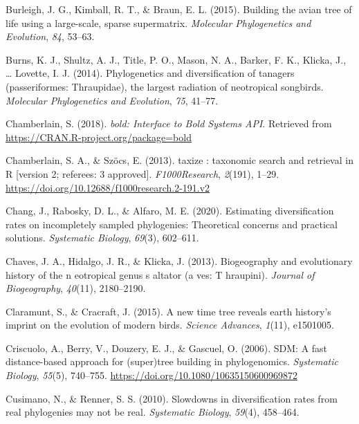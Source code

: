\documentclass[english,man]{apa6}
\begin{document}
\leavevmode\hypertarget{ref-burleigh2015building}{}%
Burleigh, J. G., Kimball, R. T., \& Braun, E. L. (2015). Building the avian tree of life using a large-scale, sparse supermatrix. \emph{Molecular Phylogenetics and Evolution}, \emph{84}, 53--63.

\leavevmode\hypertarget{ref-burns2014phylogenetics}{}%
Burns, K. J., Shultz, A. J., Title, P. O., Mason, N. A., Barker, F. K., Klicka, J., \ldots{} Lovette, I. J. (2014). Phylogenetics and diversification of tanagers (passeriformes: Thraupidae), the largest radiation of neotropical songbirds. \emph{Molecular Phylogenetics and Evolution}, \emph{75}, 41--77.

\leavevmode\hypertarget{ref-Chamberlain2018}{}%
Chamberlain, S. (2018). \emph{bold: Interface to Bold Systems API}. Retrieved from \url{https://CRAN.R-project.org/package=bold}

\leavevmode\hypertarget{ref-Chamberlain2013}{}%
Chamberlain, S. A., \& Szöcs, E. (2013). taxize : taxonomic search and retrieval in R {[}version 2; referees: 3 approved{]}. \emph{F1000Research}, \emph{2}(191), 1--29. \url{https://doi.org/10.12688/f1000research.2-191.v2}

\leavevmode\hypertarget{ref-chang2020estimating}{}%
Chang, J., Rabosky, D. L., \& Alfaro, M. E. (2020). Estimating diversification rates on incompletely sampled phylogenies: Theoretical concerns and practical solutions. \emph{Systematic Biology}, \emph{69}(3), 602--611.

\leavevmode\hypertarget{ref-chaves2013biogeography}{}%
Chaves, J. A., Hidalgo, J. R., \& Klicka, J. (2013). Biogeography and evolutionary history of the n eotropical genus s altator (a ves: T hraupini). \emph{Journal of Biogeography}, \emph{40}(11), 2180--2190.

\leavevmode\hypertarget{ref-claramunt2015new}{}%
Claramunt, S., \& Cracraft, J. (2015). A new time tree reveals earth history's imprint on the evolution of modern birds. \emph{Science Advances}, \emph{1}(11), e1501005.

\leavevmode\hypertarget{ref-Criscuolo2006}{}%
Criscuolo, A., Berry, V., Douzery, E. J., \& Gascuel, O. (2006). SDM: A fast distance-based approach for (super)tree building in phylogenomics. \emph{Systematic Biology}, \emph{55}(5), 740--755. \url{https://doi.org/10.1080/10635150600969872}

\leavevmode\hypertarget{ref-cusimano2010slowdowns}{}%
Cusimano, N., \& Renner, S. S. (2010). Slowdowns in diversification rates from real phylogenies may not be real. \emph{Systematic Biology}, \emph{59}(4), 458--464.
\end{document}
